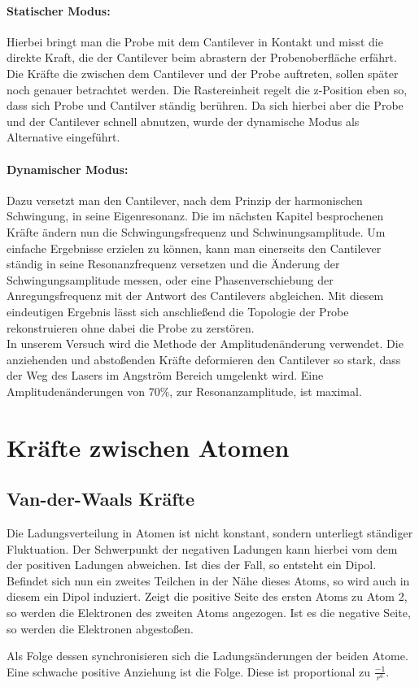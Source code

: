 \paragraph{Statischer Modus:}

Hierbei bringt man die Probe mit dem Cantilever in Kontakt und misst die direkte Kraft, die der Cantilever beim abrastern der Probenoberfläche erfährt. 
Die Kräfte die zwischen dem Cantilever und der Probe auftreten, sollen später noch genauer betrachtet werden.
Die Rastereinheit regelt die z-Position eben so, dass sich Probe und Cantilver ständig berühren.
Da sich hierbei aber die Probe und der Cantilever schnell abnutzen, wurde der 
dynamische Modus als Alternative eingeführt.

\paragraph{Dynamischer Modus:}

Dazu versetzt man den Cantilever, nach dem Prinzip der harmonischen Schwingung, in seine Eigenresonanz.
Die im nächsten Kapitel besprochenen Kräfte ändern nun die Schwingungsfrequenz und Schwinungsamplitude.
Um einfache Ergebnisse erzielen zu können, kann man einerseits den Cantilever ständig in seine Resonanzfrequenz versetzen und die Änderung der Schwingungsamplitude messen, oder eine Phasenverschiebung der Anregungsfrequenz mit der Antwort des Cantilevers abgleichen.
Mit diesem eindeutigen Ergebnis lässt sich anschließend die Topologie der Probe rekonstruieren ohne dabei die Probe zu zerstören.
\vspace{6pt}\\
In unserem Versuch wird die Methode der Amplitudenänderung verwendet. 
Die anziehenden und abstoßenden Kräfte deformieren den Cantilever so stark, dass der Weg des Lasers im Angström Bereich umgelenkt wird. 
Eine Amplitudenänderungen von 70\%, zur Resonanzamplitude, ist maximal. 


    \section{Kräfte zwischen Atomen}
        \subsection{Van-der-Waals Kräfte}

Die Ladungsverteilung in Atomen ist nicht konstant, sondern unterliegt ständiger 
Fluktuation. Der Schwerpunkt der negativen Ladungen kann hierbei vom dem der
positiven Ladungen abweichen. Ist dies der Fall, so entsteht ein Dipol. 
Befindet sich nun ein zweites Teilchen in der Nähe dieses Atoms, so wird auch
in diesem ein Dipol induziert. Zeigt die positive Seite des ersten Atoms zu Atom 2,
so werden die Elektronen des zweiten Atoms angezogen. Ist es die negative Seite, so
werden die Elektronen abgestoßen. \par
Als Folge dessen synchronisieren sich die Ladungsänderungen der beiden Atome. Eine
schwache positive Anziehung ist die Folge. Diese ist proportional zu $\displaystyle
\frac{-1}{r^6}$.

